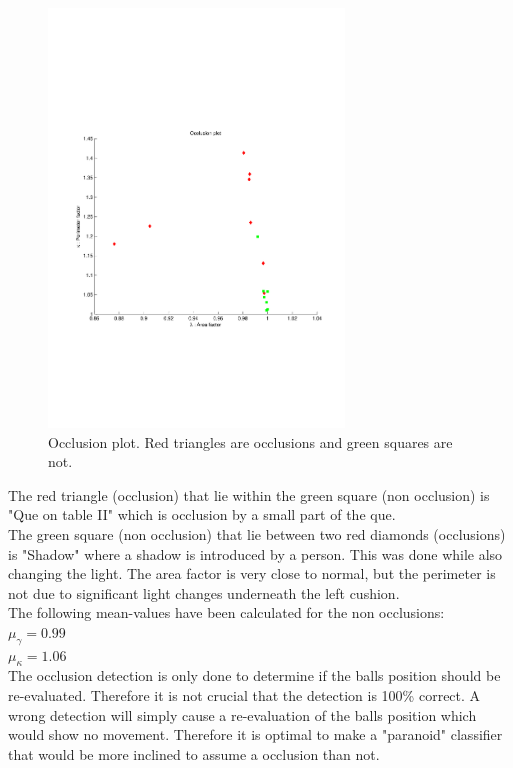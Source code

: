 \begin{figure}[H]
\begin{center}
\leavevmode
\includegraphics[width=0.7\textwidth]{images/occlusion_plot}
\end{center}
\caption{Occlusion plot. Red triangles are occlusions and green squares are not.}
\label{fig:occlusion_plot}
\end{figure}

The red triangle (occlusion) that lie within the green square (non occlusion) is "Que on table II" which is occlusion by a small part of the que.\\

The green square (non occlusion) that lie between two red diamonds (occlusions) is "Shadow" where a shadow is introduced by a person. This was done while also changing the light. The area factor is very close to normal, but the perimeter is not due to significant light changes underneath the left cushion.\\

The following mean-values have been calculated for the non occlusions:\\

$\mu_{\gamma} = 0.99$\\
$\mu_{\kappa} = 1.06$\\

The occlusion detection is only done to determine if the balls position should be re-evaluated. Therefore it is not crucial that the detection is 100\% correct. A wrong detection will simply cause a re-evaluation of the balls position which would show no movement. Therefore it is optimal to make a "paranoid" classifier that would be more inclined to assume a occlusion than not.\\

